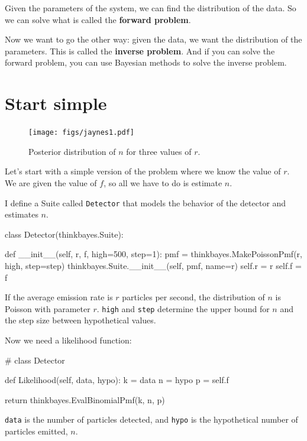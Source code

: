 \documentclass[12pt]{book}
\theoremstyle{exercise}
\begin{document}
Given the parameters of the system, we can find the distribution of
the data.  So we can solve what is called the {\bf forward problem}.

Now we want to go the other way: given the data, we
want the distribution of the parameters.  This is called
the {\bf inverse problem}.  And if you can solve the forward
problem, you can use Bayesian methods to solve the inverse problem.


\section{Start simple}

\begin{figure}
\centerline{\texttt{[image: figs/jaynes1.pdf]}}
\caption{Posterior distribution of $n$ for three values of $r$.}
\label{fig.jaynes1}
\end{figure}

Let's start with a simple version of the problem where we know
the value of $r$.  We are given the value of $f$, so all we
have to do is estimate $n$.

I define a Suite called {\tt Detector} that models the behavior
of the detector and estimates $n$.

\begin{code}
class Detector(thinkbayes.Suite):

    def __init__(self, r, f, high=500, step=1):
        pmf = thinkbayes.MakePoissonPmf(r, high, step=step)
        thinkbayes.Suite.__init__(self, pmf, name=r)
        self.r = r
        self.f = f
\end{code}

If the average emission rate is $r$ particles per second, the
distribution of $n$ is Poisson with parameter $r$.
{\tt high} and {\tt step} determine the upper bound for $n$
and the step size between hypothetical values.

Now we need a likelihood function:

\begin{code}
# class Detector

    def Likelihood(self, data, hypo):
        k = data
        n = hypo
        p = self.f

        return thinkbayes.EvalBinomialPmf(k, n, p)
\end{code}

{\tt data} is the number of particles detected, and {\tt hypo} is
the hypothetical number of particles emitted, $n$.
\end{document}
